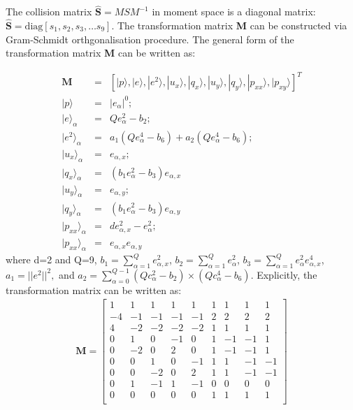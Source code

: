 The collision matrix $\hat{\mathbf{S}} = MSM^{-1}$ in moment space is a diagonal matrix: $\hat{\mathbf{S}} =\mbox{diag} \left[ s_1, s_2, s_3,\dots s_9  \right]$. The transformation matrix \textbf{M} can be constructed via Gram-Schmidt orthgonalisation procedure. The general form of the transformation matrix \textbf{M} can be written as:

\begin{eqnarray}
\mathbf{M} & = & \left[|p\rangle,|e\rangle,|e^2\rangle,|u_x\rangle,|q_x\rangle,|u_y\rangle,|q_y\rangle,|p_{xx}\rangle,|p_{xy}\rangle\right]^T \\
|p\rangle & = & |\mathit{e}_{\alpha}|^0;\\
|e\rangle_{\alpha} & = & \mathit{Q}e_{\alpha}^2-b_2;\\
|e^2\rangle_{\alpha} & = & a_1(\mathit{Q}e_{\alpha}^4-b_6)+a_2(\mathit{Q}e_{\alpha}^4-b_6);\\
|u_x\rangle_{\alpha} & = & e_{\alpha,x}; \\
|q_x\rangle_{\alpha} & = & (\mathit{b}_1e_{\alpha}^2-b_3)e_{\alpha,x}\\
|u_y\rangle_{\alpha} & = & e_{\alpha,y}; \\
|q_y\rangle_{\alpha} & = & (\mathit{b}_1e_{\alpha}^2-b_3)e_{\alpha,y}\\
|p_{xx}\rangle_{\alpha} & = & \mathit{d}e_{\alpha,x}^2-e_{\alpha}^2; \\
|p_{xx}\rangle_{\alpha}  & = & e_{\alpha,x}e_{\alpha,y}
\end{eqnarray}
\noindent where d=2 and Q=9, $b_1=\sum_{\alpha=1}^{Q}e_{\alpha,x}^2$, $b_2=\sum_{\alpha=1}^{Q}e_{\alpha}^2$, 
$b_3=\sum_{\alpha=1}^{Q}e_{\alpha}^2e_{\alpha,x}^4$, $a_1=||e^2||^2,$ and $a_2=\sum_{\alpha=0}^{Q-1}(Qc_{\alpha}^2-b_2)\times(Qc_{\alpha}^4-b_6)$. Explicitly, the transformation matrix can be written as:
\begin{eqnarray}
\mathbf{M}= \begin{bmatrix}
 1 &  1 &  1 &  1 &  1 &  1 &  1 &  1 &  1 \\
-4 & -1 & -1 & -1 & -1 &  2 &  2 &  2 &  2 \\ 
 4 & -2 & -2 & -2 & -2 &  1 &  1 &  1 &  1 \\
 0 &  1 &  0 & -1 &  0 &  1 & -1 & -1 &  1 \\
 0 & -2 &  0 &  2 &  0 &  1 & -1 & -1 &  1 \\
 0 &  0 &  1 &  0 & -1 &  1 &  1 & -1 & -1 \\
 0 &  0 & -2 &  0 &  2 &  1 &  1 & -1 & -1 \\
 0 &  1 & -1 &  1 & -1 &  0 &  0 &  0 &  0 \\
 0 &  0 &  0 &  0 &  0 &  1 &  1 &  1 &  1 \\
\end{bmatrix}
\end{eqnarray}
